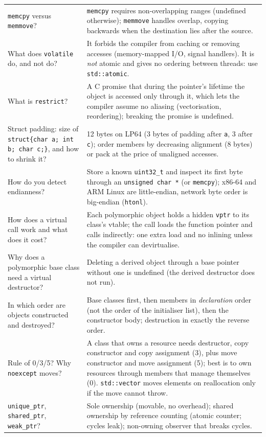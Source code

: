 \documentclass[10pt,a4paper,openany,oneside]{report}
\begin{document}
\begin{center}
\begin{xltabular}{\textwidth}{@{}L{4.6cm}Y@{}}
\texttt{memcpy} versus \texttt{memmove}? & \texttt{memcpy} requires non-overlapping ranges (undefined otherwise); \texttt{memmove} handles overlap, copying backwards when the destination lies after the source.\\
What does \texttt{volatile} do, and not do? & It forbids the compiler from caching or removing accesses (memory-mapped I/O, signal handlers). It is \emph{not} atomic and gives no ordering between threads: use \texttt{std::atomic}.\\
What is \texttt{restrict}? & A C promise that during the pointer's lifetime the object is accessed only through it, which lets the compiler assume no aliasing (vectorisation, reordering); breaking the promise is undefined.\\
Struct padding: size of \texttt{struct\{char a; int b; char c;\}}, and how to shrink it? & 12 bytes on LP64 (3 bytes of padding after \texttt{a}, 3 after \texttt{c}); order members by decreasing alignment (8 bytes) or pack at the price of unaligned accesses.\\
How do you detect endianness? & Store a known \texttt{uint32\_t} and inspect its first byte through an \texttt{unsigned char *} (or \texttt{memcpy}); x86-64 and ARM Linux are little-endian, network byte order is big-endian (\texttt{htonl}).\\
How does a virtual call work and what does it cost? & Each polymorphic object holds a hidden \texttt{vptr} to its class's vtable; the call loads the function pointer and calls indirectly: one extra load and no inlining unless the compiler can devirtualise.\\
Why does a polymorphic base class need a virtual destructor? & Deleting a derived object through a base pointer without one is undefined (the derived destructor does not run).\\
In which order are objects constructed and destroyed? & Base classes first, then members in \emph{declaration} order (not the order of the initialiser list), then the constructor body; destruction in exactly the reverse order.\\
Rule of 0/3/5? Why \texttt{noexcept} moves? & A class that owns a resource needs destructor, copy constructor and copy assignment (3), plus move constructor and move assignment (5); best is to own resources through members that manage themselves (0). \texttt{std::vector} moves elements on reallocation only if the move cannot throw.\\
\texttt{unique\_ptr}, \texttt{shared\_ptr}, \texttt{weak\_ptr}? & Sole ownership (movable, no overhead); shared ownership by reference counting (atomic counter; cycles leak); non-owning observer that breaks cycles.\\

\end{xltabular}
\end{center}
\end{document}
